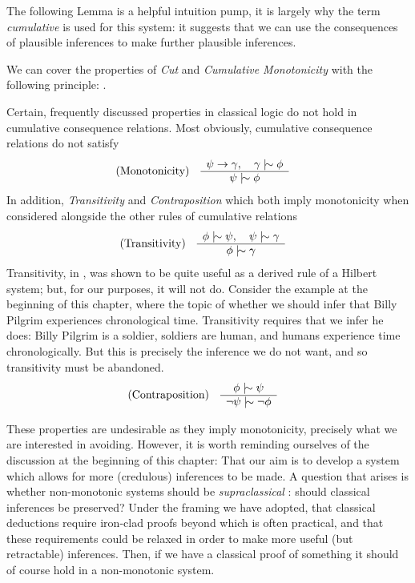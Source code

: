 The following Lemma is a helpful intuition pump, it is largely why the term \textit{cumulative} is used for this system:
it suggests that we can use the consequences of plausible inferences to make further plausible inferences.
\begin{lemma}
	\label{lemma:cut-cautious} We can cover the properties of \emph{Cut} and \emph{Cumulative Monotonicity} with the following
	principle: .
\end{lemma}

Certain, frequently discussed properties in classical logic do not hold in cumulative consequence relations. Most
obviously, cumulative consequence relations do not satisfy
\begin{align}
	\label{postulate:monotonicity}\inferLeft{Monotonicity}{\psi \rightarrow \gamma, \quad \gamma \twiddle \phi}{\psi \twiddle \phi}
\end{align}
In addition, \textit{Transitivity} and \textit{Contraposition} which both imply monotonicity when considered alongside
the other rules of cumulative relations
\begin{align}
	\label{postulate:trans}\inferLeft{Transitivity}{\phi \twiddle \psi, \quad \psi \twiddle \gamma}{\phi \twiddle \gamma}
\end{align}
Transitivity, in , was shown to be quite useful as a derived rule of a Hilbert system; but, for
our purposes, it will not do. Consider the example at the beginning of this chapter, where the topic of whether we should
infer that Billy Pilgrim experiences chronological time. Transitivity requires that we infer he does: Billy Pilgrim is a
soldier, soldiers are human, and humans experience time chronologically. But this is precisely the inference we do not
want, and so transitivity must be abandoned.
%
\begin{align}
	\label{postulate:contra}\inferLeft{Contraposition}{\phi \twiddle \psi}{\neg \psi \twiddle \neg \phi}
\end{align}

These properties are undesirable as they imply monotonicity, precisely what we are interested in avoiding. However, it
is worth reminding ourselves of the discussion at the beginning of this chapter: That our aim is to develop a system which
allows for more (credulous) inferences to be made. A question that arises is whether non-monotonic systems should be
\textit{supraclassical} \cite{makinson2003bridges}: should classical inferences be preserved? Under the framing we have adopted,
that classical deductions require iron-clad proofs beyond which is often practical, and that these requirements could be
relaxed in order to make more useful (but retractable) inferences. Then, if we have a classical proof of something it should
of course hold in a non-monotonic system.


